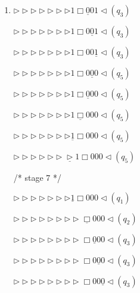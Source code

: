 \documentclass[12pt,a4paper]{article}
\makeatletter
\newtheorem*{solution}{Solution}
\theoremstyle{definition}
\renewenvironment{solution}[1][Solution] {\par\pushQED{\qed}\normalfont\topsep6\p@\@plus6\p@\relax\trivlist\item[\hskip\labelsep\bfseries#1\@addpunct{.}]\ignorespaces}{\popQED\endtrivlist\@endpefalse} \makeatother
\makeatother
\begin{document}
\begin{enumerate}
\begin{solution}
\begin{minipage}{0.3\textwidth}
		$\triangleright\triangleright\triangleright\triangleright\triangleright\triangleright\triangleright1\Box\underline{0}01\triangleleft(q_3)$
	
		$\triangleright\triangleright\triangleright\triangleright\triangleright\triangleright\triangleright1\Box0\underline{0}1\triangleleft(q_3)$
		
		$\triangleright\triangleright\triangleright\triangleright\triangleright\triangleright\triangleright1\Box00\underline{1}\triangleleft(q_3)$
		
		$\triangleright\triangleright\triangleright\triangleright\triangleright\triangleright\triangleright1\Box0\underline{0}0\triangleleft(q_5)$
		
		$\triangleright\triangleright\triangleright\triangleright\triangleright\triangleright\triangleright1\Box\underline{0}00\triangleleft(q_5)$
		
		$\triangleright\triangleright\triangleright\triangleright\triangleright\triangleright\triangleright1\underline{\Box}000\triangleleft(q_5)$
		
		$\triangleright\triangleright\triangleright\triangleright\triangleright\triangleright\triangleright\underline{1}\Box000\triangleleft(q_5)$
		
		$\triangleright\triangleright\triangleright\triangleright\triangleright\triangleright\underline{\triangleright}1\Box000\triangleleft(q_5)$
		
	\end{minipage}
	\begin{minipage}{0.3\textwidth}
		\centering
		/* stage 7 */
		
		$\triangleright\triangleright\triangleright\triangleright\triangleright\triangleright\triangleright\underline{1}\Box000\triangleleft(q_1)$
		
		$\triangleright\triangleright\triangleright\triangleright\triangleright\triangleright\triangleright\triangleright\underline{\Box}000\triangleleft(q_2)$
		
		$\triangleright\triangleright\triangleright\triangleright\triangleright\triangleright\triangleright\triangleright\Box\underline{0}00\triangleleft(q_3)$
		
		$\triangleright\triangleright\triangleright\triangleright\triangleright\triangleright\triangleright\triangleright\Box0\underline{0}0\triangleleft(q_3)$

		$\triangleright\triangleright\triangleright\triangleright\triangleright\triangleright\triangleright\triangleright\Box00\underline{0}\triangleleft(q_3)$
		

\end{minipage}
\end{solution}
\end{enumerate}
\end{document}
